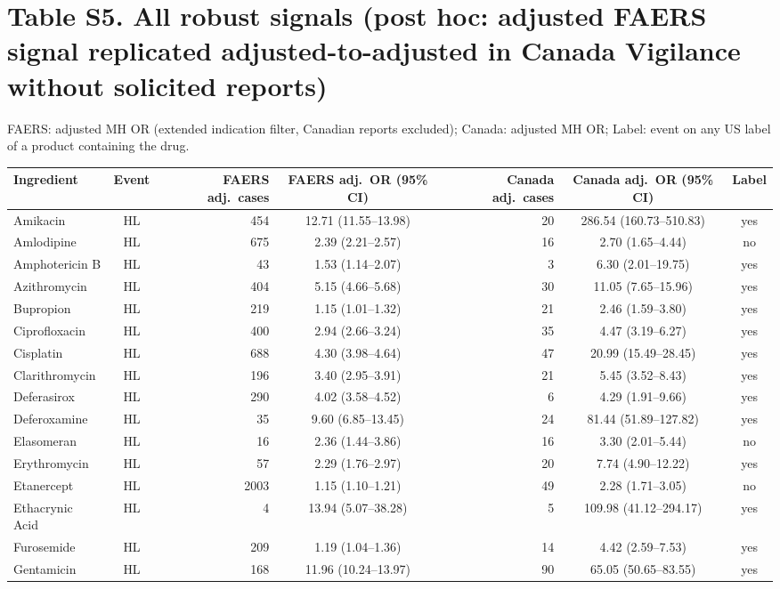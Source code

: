 \documentclass[10pt]{article}
\begin{document}
\section*{Table S5. All robust signals (post hoc: adjusted FAERS signal replicated adjusted-to-adjusted in Canada Vigilance without solicited reports)}
FAERS: adjusted MH OR (extended indication filter, Canadian reports excluded); Canada: adjusted MH OR; Label: event on any US label of a product containing the drug.
{\footnotesize
\begin{longtable}{lcrcrcc}
\toprule
Ingredient & Event & FAERS adj.\ cases & FAERS adj.\ OR (95\% CI) & Canada adj.\ cases & Canada adj.\ OR (95\% CI) & Label \\
\midrule
Amikacin & HL & 454 & 12.71 (11.55--13.98) & 20 & 286.54 (160.73--510.83) & yes \\
Amlodipine & HL & 675 & 2.39 (2.21--2.57) & 16 & 2.70 (1.65--4.44) & no \\
Amphotericin B & HL & 43 & 1.53 (1.14--2.07) & 3 & 6.30 (2.01--19.75) & yes \\
Azithromycin & HL & 404 & 5.15 (4.66--5.68) & 30 & 11.05 (7.65--15.96) & yes \\
Bupropion & HL & 219 & 1.15 (1.01--1.32) & 21 & 2.46 (1.59--3.80) & yes \\
Ciprofloxacin & HL & 400 & 2.94 (2.66--3.24) & 35 & 4.47 (3.19--6.27) & yes \\
Cisplatin & HL & 688 & 4.30 (3.98--4.64) & 47 & 20.99 (15.49--28.45) & yes \\
Clarithromycin & HL & 196 & 3.40 (2.95--3.91) & 21 & 5.45 (3.52--8.43) & yes \\
Deferasirox & HL & 290 & 4.02 (3.58--4.52) & 6 & 4.29 (1.91--9.66) & yes \\
Deferoxamine & HL & 35 & 9.60 (6.85--13.45) & 24 & 81.44 (51.89--127.82) & yes \\
Elasomeran & HL & 16 & 2.36 (1.44--3.86) & 16 & 3.30 (2.01--5.44) & no \\
Erythromycin & HL & 57 & 2.29 (1.76--2.97) & 20 & 7.74 (4.90--12.22) & yes \\
Etanercept & HL & 2003 & 1.15 (1.10--1.21) & 49 & 2.28 (1.71--3.05) & no \\
Ethacrynic Acid & HL & 4 & 13.94 (5.07--38.28) & 5 & 109.98 (41.12--294.17) & yes \\
Furosemide & HL & 209 & 1.19 (1.04--1.36) & 14 & 4.42 (2.59--7.53) & yes \\
Gentamicin & HL & 168 & 11.96 (10.24--13.97) & 90 & 65.05 (50.65--83.55) & yes \\

\end{longtable}}
\end{document}
